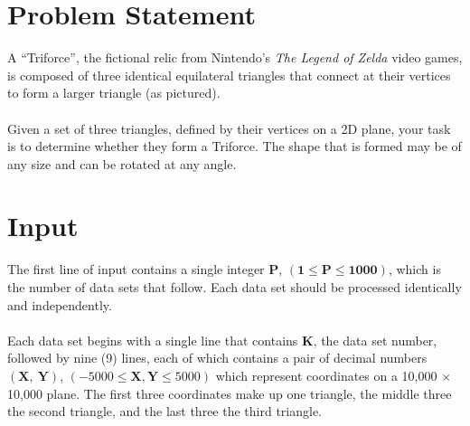 \documentclass[11pt]{article}
\begin{document}
\pagestyle{fancy}


\section{Problem Statement}

\begin{figure}
\end{figure}
A ``Triforce'', the fictional relic from Nintendo's \emph{The Legend of Zelda}
video games, is composed of three identical equilateral triangles that connect
at their vertices to form a larger triangle (as pictured).
\\\\
Given a set of three triangles, defined by their vertices on a 2D plane,
your task is to determine whether they form a Triforce. The shape that is
formed may be of any size and can be rotated at any angle.

\section{Input}
The first line of input contains a single integer $\boldsymbol{P}$,
$(\boldsymbol{1} \le \boldsymbol{P} \le \boldsymbol{1000})$, which is the
number of data sets that follow. Each data set should be processed identically
and independently.
\\\\
Each data set begins with a single line that contains $\boldsymbol{K}$, the data
set number, followed by nine (9) lines, each of which contains a pair of decimal numbers
$(\boldsymbol{X},\ \boldsymbol{Y})$, $(-5000 \le \boldsymbol{X},\boldsymbol{Y} \le 5000)$
which represent coordinates on a 10,000 $\times$ 10,000 plane. The first three
coordinates make up one triangle, the middle three the second triangle, and
the last three the third triangle.
\end{document}
